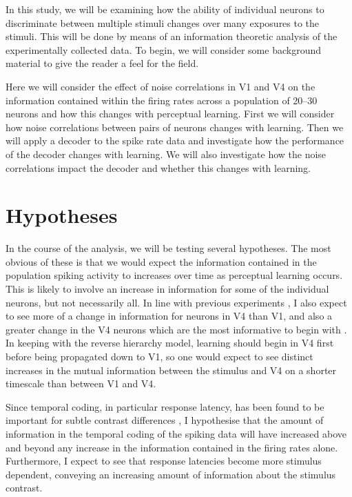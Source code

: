 In this study, we will be examining how the ability of individual neurons to discriminate between multiple stimuli changes over many exposures to the stimuli.
This will be done by means of an information theoretic analysis of the experimentally collected data.
To begin, we will consider some background material to give the reader a feel for the field.

Here we will consider the effect of noise correlations in V1 and V4 on the information contained within the firing rates across a population of 20--30 neurons and how this changes with perceptual learning.
First we will consider how noise correlations between pairs of neurons changes with learning. Then we will apply a decoder to the spike rate data and investigate how the performance of the decoder changes with learning. We will also investigate how the noise correlations impact the decoder and whether this changes with learning.


\section{Hypotheses}

In the course of the analysis, we will be testing several hypotheses.
The most obvious of these is that we would expect the information contained in the population spiking activity to increases over time as perceptual learning occurs. This is likely to involve an increase in information for some of the individual neurons, but not necessarily all.
In line with previous experiments \cite{Raiguel2006}, I also expect to see more of a change in information for neurons in V4 than V1, and also a greater change in the V4 neurons which are the most informative to begin with \cite{Raiguel2006}.
In keeping with the reverse hierarchy model, learning should begin in V4 first before being propagated down to V1, so one would expect to see distinct increases in the mutual information between the stimulus and V4 on a shorter timescale than between V1 and V4.

Since temporal coding, in particular response latency, has been found to be important for subtle contrast differences \cite{Reich2001,Arabzadeh2006}, I hypothesise that the amount of information in the temporal coding of the spiking data will have increased above and beyond any increase in the information contained in the firing rates alone. Furthermore, I expect to see that response latencies become more stimulus dependent, conveying an increasing amount of information about the stimulus contrast.

